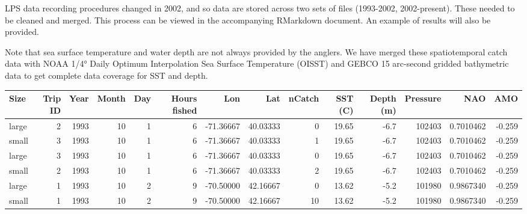 \documentclass[
]{article}
\let\origtable\table
\let\endorigtable\endtable
\renewenvironment{table}[1][2] {
    \expandafter\origtable\expandafter[H]
} {
    \endorigtable
}
\begin{document}
LPS data recording procedures changed in 2002, and so data are stored across two sets of files (1993-2002, 2002-present). These needed to be cleaned and merged. This process can be viewed in the accompanying RMarkdown document. An example of results will also be provided.

Note that sea surface temperature and water depth are not always provided by the anglers. We have merged these spatiotemporal catch data with NOAA 1/4° Daily Optimum Interpolation Sea Surface Temperature (OISST) and GEBCO 15 arc-second gridded bathymetric data to get complete data coverage for SST and depth.

\begin{landscape}\begin{table}[H]

\caption{\label{tab:mergelps}American Large Pelagic Survey example}
\centering
\begin{tabular}[t]{lrrrrrrrrrrrrr}
\toprule
Size & Trip
ID & Year & Month & Day & Hours
fished & Lon & Lat & nCatch & SST
(C) & Depth
(m) & Pressure & NAO & AMO\\
\midrule
large & 2 & 1993 & 10 & 1 & 6 & -71.36667 & 40.03333 & 0 & 19.65 & -6.7 & 102403 & 0.7010462 & -0.259\\
small & 3 & 1993 & 10 & 1 & 6 & -71.36667 & 40.03333 & 1 & 19.65 & -6.7 & 102403 & 0.7010462 & -0.259\\
large & 3 & 1993 & 10 & 1 & 6 & -71.36667 & 40.03333 & 0 & 19.65 & -6.7 & 102403 & 0.7010462 & -0.259\\
small & 2 & 1993 & 10 & 1 & 6 & -71.36667 & 40.03333 & 2 & 19.65 & -6.7 & 102403 & 0.7010462 & -0.259\\
large & 1 & 1993 & 10 & 2 & 9 & -70.50000 & 42.16667 & 0 & 13.62 & -5.2 & 101980 & 0.9867340 & -0.259\\
\addlinespace
small & 1 & 1993 & 10 & 2 & 9 & -70.50000 & 42.16667 & 10 & 13.62 & -5.2 & 101980 & 0.9867340 & -0.259\\
\bottomrule
\end{tabular}
\end{table}
\end{landscape}
\end{document}
